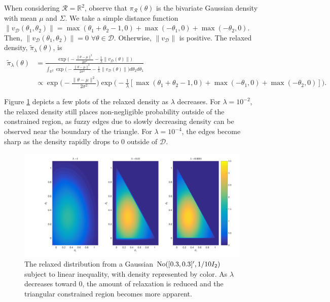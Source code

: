 \documentclass[10pt,fleqn]{article} \pdfoutput=1
\newcommand{\bb}[1]{\mathbb{#1}} \newcommand{\mc}[1]{\mathcal{#1}}
\DeclareMathOperator{\1}{\mathbbm{1}} \DeclareMathOperator{\bigO}{\mc O}
\begin{document}
When considering $\mc R=\bb R^2$, observe that $\pi_{\mc R}(\theta)$ is the 
bivariate Gaussian density with mean $\mu$ and $\Sigma$. We take a simple distance function $\|v_{\mc
D}(\theta_1,\theta_2)\| =
	\max(\theta_1+\theta_2 -1,0) + \max(-\theta_1,0) + \max(-\theta_2,0)$.
Then, $\|v_{\mc D}(\theta_1,\theta_2)\| = 0$ $\forall \theta\in\mathcal{D}$.
Otherwise, $\|v_{\mc D}\|$ is positive. The relaxed density, $\tilde{\pi}_\lambda(\theta)$,
is \begin{equation} \begin{split} \tilde{\pi}_\lambda(\theta)
		&=\frac{\exp\bigg(-\frac{\|\theta-\mu\|^2}{2\sigma^2} -
			\frac{1}{\lambda} \| v_{\mc D}(\theta)\| \bigg)}{\int_{\mathbb{R}^2}
			\exp\bigg(-\frac{\|\theta-\mu\|^2}{2\sigma^2}-\frac{1}{\lambda}\|v_{\mc
				D}(\theta)\|
			\bigg)d\theta_2d\theta_1}\\ & \propto
		\exp\bigg(-\frac{\|\theta-\mu\|^2}{2\sigma^2}\bigg)\exp\bigg( -
		\frac{1}{\lambda}[\max(\theta_1+\theta_2 -1,0) + \max(-\theta_1,0) +
				\max(-\theta_2,0)] \bigg).  \end{split}
	\label{EQ:Relaxed_Density_Bivariate_Normal_Triangle} \end{equation}

Figure \ref{FIG:Bivariate_Normal_Triangle_Constraint_Relaxation} depicts a few
plots of the relaxed density as $\lambda$ decreases.
For $\lambda= 10^{-2}$, the relaxed density still places
non-negligible probability outside of the constrained region,
as fuzzy edges due to slowly decreasing density can be observed near the boundary of the triangle. For $\lambda=10^{-4}$, the edges become sharp
as the density rapidly drops to $0$ outside of $\mc D$.

\begin{figure}[H] \begin{center}
		\includegraphics[width=1\textwidth]{Bivariate_Normal_Triangle_Constraint}
	\end{center} \caption{The relaxed distribution from a 
		Gaussian $\operatorname{No}([0.3,0.3]',1/{10}I_2)$ subject to linear inequality, with density
		represented by color. As $\lambda$
		decreases toward $0$, the amount of relaxation is reduced and the triangular constrained region becomes more apparent.}
	\label{FIG:Bivariate_Normal_Triangle_Constraint_Relaxation} \end{figure} 
\end{document}
